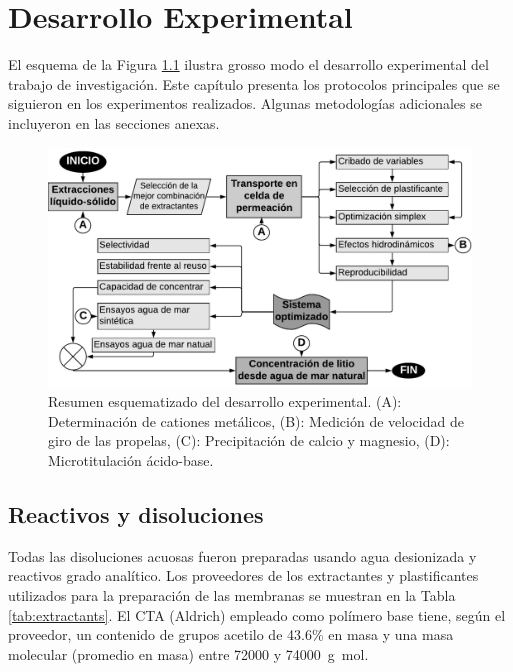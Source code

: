 \chapter{Desarrollo Experimental}
\vspace{-1\baselineskip}El esquema de la Figura \ref{fig:expresumen} ilustra grosso modo el desarrollo experimental del trabajo de investigación. Este capítulo presenta los protocolos principales que se siguieron en los experimentos realizados. Algunas metodologías adicionales se incluyeron en las secciones anexas.\enlargethispage{3\baselineskip}
{
\begin{figure}[H]
    \includegraphics[width=\textwidth]{chap3/summary.pdf}
    \caption[Resumen esquematizado del desarrollo experimental.]{Resumen esquematizado del desarrollo experimental. (A): Determinación de cationes metálicos, (B): Medición de velocidad de giro de las propelas, (C): Precipitación de calcio y magnesio, (D): Microtitulación ácido-base.}
    \label{fig:expresumen}
\end{figure}}

\clearpage\section{Reactivos y disoluciones}
Todas las disoluciones acuosas fueron preparadas usando agua desionizada y reactivos grado analítico. Los proveedores de los extractantes y plastificantes utilizados para la preparación de las membranas se muestran en la Tabla \ref{tab:extractants}. El \ac{CTA} (Aldrich) empleado como polímero base tiene, según el proveedor, un contenido de grupos acetilo de 43.6\% en masa y una masa molecular (promedio en masa) entre 72000 y 74000~g~mol\mnn. 

